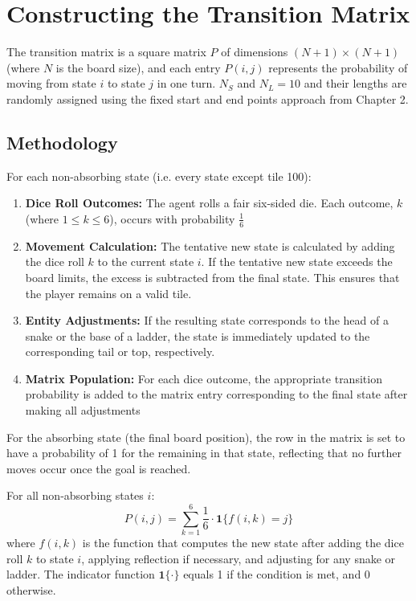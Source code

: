 \section{Constructing the Transition Matrix}
The transition matrix is a square matrix $P$ of dimensions $(N+1)  \times (N+1)$ (where $N$ is the board size), and each entry $P(i,j)$ represents the probability of moving from state $i$ to state $j$ in one turn. $N_S$ and $N_L = 10$ and their lengths are randomly assigned using the fixed start and end points approach from Chapter 2.

\subsection{Methodology}
For each non-absorbing state (i.e. every state except tile 100):
\begin{enumerate}
	\item \textbf{Dice Roll Outcomes:} The agent rolls a fair six-sided die. Each outcome, $k$ (where $1 \leq k \leq 6$), occurs with probability $\frac{1}{6}$
	\item \textbf{Movement Calculation:} The tentative new state is calculated by adding the dice roll $k$ to the current state $i$. If the tentative new state exceeds the board limits, the excess is subtracted from the final state. This ensures that the player remains on a valid tile.
	\item \textbf{Entity Adjustments:} If the resulting state corresponds to the head of a snake or the base of a ladder, the state is immediately updated to the corresponding tail or top, respectively.
	\item \textbf{Matrix Population:} For each dice outcome, the appropriate transition probability is added to the matrix entry corresponding to the final state after making all adjustments
\end{enumerate}

For the absorbing state (the final board position), the row in the matrix is set to have a probability of 1 for the remaining in that state, reflecting that no further moves occur once the goal is reached.

For all non-absorbing states $i$:
\[
P(i, j) = \sum_{k=1}^{6} \frac{1}{6} \cdot \mathbf{1}\{ f(i,k) = j \}
\]
where $f(i,k)$ is the function that computes the new state after adding the dice roll $k$ to state $i$, applying reflection if necessary, and adjusting for any snake or ladder. The indicator function $\mathbf{1}\{\cdot\}$ equals 1 if the condition is met, and 0 otherwise.

